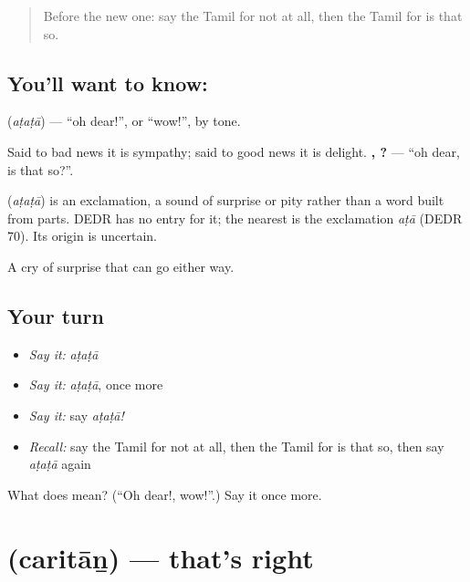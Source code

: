 \label{lesson:TA-C96-adada}



\begin{quote}
Before the new one: say the Tamil for not at all, then the Tamil for is that so.
\end{quote}

\subsection*{You'll want to know: }
\textbf{} (\emph{aṭaṭā}) — \textquotedblleft{}oh dear!\textquotedblright{}, or \textquotedblleft{}wow!\textquotedblright{}, by tone.

Said to bad news it is sympathy; said to good news it is delight. \textbf{, ?} — \textquotedblleft{}oh dear, is that so?\textquotedblright{}.

\begin{cousinweb}
\textbf{} (\emph{aṭaṭā}) is an exclamation, a sound of surprise or pity rather than a word built from parts. DEDR has no entry for it; the nearest is the exclamation \emph{aṭā} (DEDR 70). Its origin is uncertain.
\end{cousinweb}

\begin{grammarlens}[title={What you've built}]
A cry of surprise that can go either way.
\end{grammarlens}

\subsection*{Your turn}
\begin{itemize}
\raggedright
  \item \emph{Say it:} \emph{aṭaṭā}
  \item \emph{Say it:} \emph{aṭaṭā}, once more
  \item \emph{Say it:} say \emph{aṭaṭā!}
  \item \emph{Recall:} say the Tamil for not at all, then the Tamil for is that so, then say \emph{aṭaṭā} again
\end{itemize}

\begin{tcolorbox}[breakable,colback=teal!4,colframe=teal!35!black,title={Before you move on}]
What does  mean? (\textquotedblleft{}Oh dear!, wow!\textquotedblright{}.) Say it once more.
\end{tcolorbox}
\section[\texorpdfstring{\ta{சரிதான்} (caritāṉ)}{சரிதான் (caritāṉ)}]{ (caritāṉ) — that's right}

